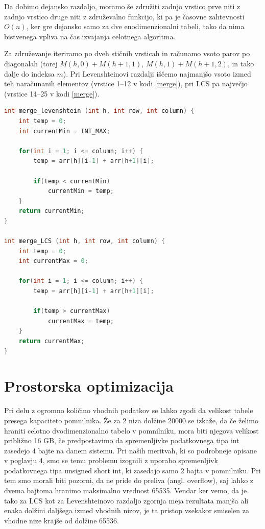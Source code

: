 \documentclass[a4paper,12pt,openright]{book}
\begin{document}
Da dobimo dejansko razdaljo, moramo še združiti zadnjo vrstico prve niti z zadnjo vrstico druge niti z združevalno funkcijo, ki pa je časovne zahtevnosti $O(n)$, ker gre dejansko samo za dve enodimenzionalni tabeli, tako da nima bistvenega vpliva na čas izvajanja celotnega algoritma. 

Za združevanje iteriramo po dveh stičnih vrsticah in računamo vsoto parov po diagonalah (torej $M(h, 0) + M(h+1, 1)$, $M(h, 1) + M(h+1, 2)$, in tako dalje do indeksa $m$). Pri Levenshteinovi razdalji iščemo najmanjšo vsoto izmed teh naračunanih elementov (vrstice 1--12 v kodi \ref{merge}), pri LCS pa največjo (vrstice 14--25 v kodi \ref{merge}). 

\bigskip
\begin{lstlisting}[language=C++, caption={Združevalni funkciji za Levenshteinovo razdaljo in LCS}, captionpos=b, label=merge]
int merge_levenshtein (int h, int row, int column) {
    int temp = 0;
    int currentMin = INT_MAX;

    for(int i = 1; i <= column; i++) {
        temp = arr[h][i-1] + arr[h+1][i];

        if(temp < currentMin)
            currentMin = temp;
    }
    return currentMin;
}

int merge_LCS (int h, int row, int column) {
    int temp = 0;
    int currentMax = 0;

    for(int i = 1; i <= column; i++) {
        temp = arr[h][i-1] + arr[h+1][i];

        if(temp > currentMax)
            currentMax = temp;
    }
    return currentMax;
}
\end{lstlisting}

\section{Prostorska optimizacija}

Pri delu z ogromno količino vhodnih podatkov se lahko zgodi da velikost tabele presega kapaciteto pomnilnika. Že za 2 niza dolžine 20000 se izkaže, da če želimo hraniti celotno dvodimenzionalno tabelo v pomnilniku, mora biti njegova velikost približno 16 GB, če predpostavimo da spremenljivke podatkovnega tipa int zasedejo 4 bajte na danem sistemu. Pri naših meritvah, ki so podrobneje opisane v poglavju 4, smo se temu problemu izognili z uporabo spremenljivk podatkovnega tipa unsigned short int, ki zasedajo samo 2 bajta v pomnilniku. Pri tem smo morali biti pozorni, da ne pride do preliva (angl. overflow), saj lahko z dvema bajtoma hranimo maksimalno vrednost 65535. Vendar ker vemo, da je tako za LCS kot za Levenshteinovo razdaljo zgornja meja rezultata manjša ali enaka dolžini daljšega izmed vhodnih nizov, je ta pristop vsekakor smiselen za vhodne nize krajše od dolžine 65536. 
\end{document}
